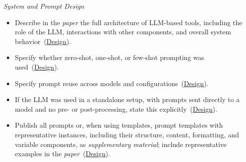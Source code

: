 \documentclass[smallextended]{svjour3}
\makeatletter
\newcommand{\must}{\textbf{must}\xspace}
\newcommand{\paper}{\emph{paper}\xspace}
\newcommand{\supplementarymaterial}{\emph{supplementary material}\xspace}
\newcommand{\paper}{\emph{paper}\xspace}
\newcommand{\supplementarymaterial}{\emph{supplementary material}\xspace}
\newcommand{\iconM}{\usebox{\iconMbox}\xspace}
\newcommand{\iconM}{●\xspace}
\newcommand{\condition}[1]{\texttt{\small[#1]}\,}
\newcommand{\condition}[1]{@@cond:#1@@}
\newcommand{\refdesign}{\hyperref[sec:report-system-and-prompt-design]{Design}}
\newcommand{\refdesign}{\href{/guidelines/design/}{Design}}
\makeatother
\begin{document}
\begin{appendices}
\noindent\textit{System and Prompt Design}
\begin{itemize}[label={},leftmargin=*]
    \item \iconM Describe in the \paper the full architecture of LLM-based tools, including the role of the LLM, interactions with other components, and overall system behavior~(\refdesign).
    \item \iconM Specify whether zero-shot, one-shot, or few-shot prompting was used~(\refdesign).
    \item \iconM Specify prompt reuse across models and configurations~(\refdesign).
    \item \iconM If the LLM was used in a standalone setup, with prompts sent directly to a model and no pre- or post-processing, state this explicitly~(\refdesign).
    \item \iconM Publish all prompts or, when using templates, prompt templates with representative instances, including their structure, content, formatting, and variable components, as \supplementarymaterial; include representative examples in the \paper~(\refdesign).

\end{itemize}
\end{appendices}
\end{document}
